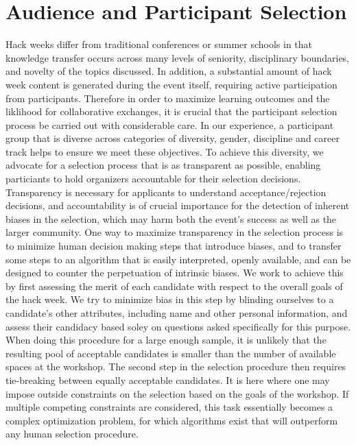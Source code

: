 \section*{Audience and Participant Selection}

Hack weeks differ from traditional conferences or summer schools in that knowledge transfer occurs across many levels of seniority, disciplinary boundaries, and novelty of the topics discussed.
In addition, a substantial amount of hack week content is generated during the event itself, requiring active participation from participants.
Therefore in order to maximize learning outcomes and the liklihood for collaborative exchanges, it is crucial that the participant selection process be carried out with considerable care.
In our experience, a participant group that is diverse across categories of diversity, gender, discipline and career track helps to ensure we meet these objectives.
To achieve this diversity, we advocate for a selection process that is as transparent as possible, enabling particiants to hold organizers accountable for their selection decisions.
Transparency is necessary for applicants to understand acceptance/rejection decisions, and accountability is of crucial importance for the detection of inherent biases in the selection, which may harm both the event's success as well as the larger community.
One way to maximize transparency in the selection process is to minimize human decision making steps that introduce biases, and to transfer some steps to an algorithm that is easily interpreted, openly available, and can be designed to counter the perpetuation of intrinsic biases. 
We work to achieve this by first assessing the merit of each candidate with respect to the overall goals of the hack week.
We try to minimize bias in this step by blinding ourselves to a candidate's other attributes, including name and other personal information, and assess their candidacy based soley on questions asked specifically for this purpose.
When doing this procedure for a large enough sample, it is unlikely that the resulting pool of acceptable candidates is smaller than the number of available spaces at the workshop.
The second step in the selection procedure then requires tie-breaking between equally acceptable candidates.
It is here where one may impose outside constraints on the selection based on the goals of the workshop.
If multiple competing constraints are considered, this task essentially becomes a complex optimization problem, for which algorithms exist that will outperform any human selection procedure.

